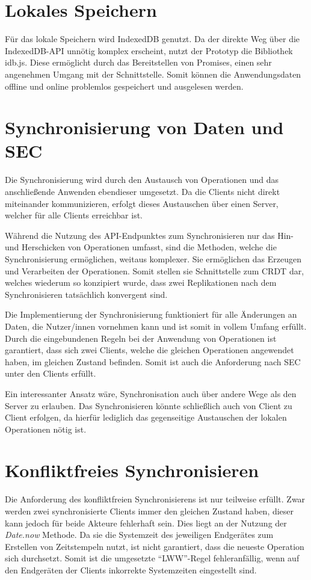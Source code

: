 \documentclass[a4paper, 12pt]{scrreprt}
\begin{document}
\section{Lokales Speichern}
Für das lokale Speichern wird IndexedDB genutzt. Da der direkte Weg über die IndexedDB-API unnötig komplex erscheint, nutzt der Prototyp die Bibliothek idb.js. Diese ermöglicht durch das Bereitstellen von Promises, einen sehr angenehmen Umgang mit der Schnittstelle. Somit können die Anwendungsdaten offline und online problemlos gespeichert und ausgelesen werden.

\section{Synchronisierung von Daten und SEC}

Die Synchronisierung wird durch den Austausch von Operationen und das anschließende Anwenden ebendieser umgesetzt. Da die Clients nicht direkt miteinander kommunizieren, erfolgt dieses Austauschen über einen Server, welcher für alle Clients erreichbar ist. 

Während die Nutzung des API-Endpunktes zum Synchronisieren nur das Hin- und Herschicken von Operationen umfasst, sind die Methoden, welche die Synchronisierung ermöglichen, weitaus komplexer. Sie ermöglichen das Erzeugen und Verarbeiten der Operationen. Somit stellen sie Schnittstelle zum CRDT dar, welches wiederum so konzipiert wurde, dass zwei Replikationen nach dem Synchronisieren tatsächlich konvergent sind.

Die Implementierung der Synchronisierung funktioniert für alle Änderungen an Daten, die Nutzer/innen vornehmen kann und ist somit in vollem Umfang erfüllt. Durch die eingebundenen Regeln bei der Anwendung von Operationen ist garantiert, dass sich zwei Clients, welche die gleichen Operationen angewendet haben, im gleichen Zustand befinden. Somit ist auch die Anforderung nach \ac{SEC} unter den Clients erfüllt. 

Ein interessanter Ansatz wäre, Synchronisation auch über andere Wege als den Server zu erlauben. Das Synchronisieren könnte schließlich auch von Client zu Client erfolgen, da hierfür lediglich das gegenseitige Austauschen der lokalen Operationen nötig ist.

\section{Konfliktfreies Synchronisieren}
Die Anforderung des konfliktfreien Synchronisierens ist nur teilweise erfüllt. Zwar werden zwei synchronisierte Clients immer den gleichen Zustand haben, dieser kann jedoch für beide Akteure fehlerhaft sein. Dies liegt an der Nutzung der \textit{Date.now} Methode. Da sie die Systemzeit des jeweiligen Endgerätes zum Erstellen von Zeitstempeln nutzt, ist nicht garantiert, dass die neueste Operation sich durchsetzt. Somit ist die umgesetzte \enquote{LWW}-Regel fehleranfällig, wenn auf den Endgeräten der Clients inkorrekte Systemzeiten eingestellt sind.
\end{document}
